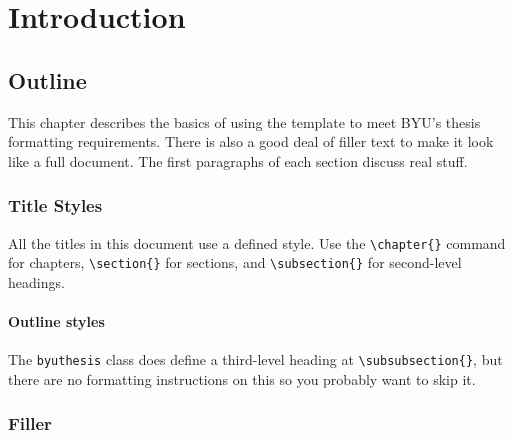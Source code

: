 \chapter{Introduction}

\section{Outline}

This chapter describes the basics of using the template to meet BYU's
thesis formatting requirements. There is also a good deal of filler text to
make it look like a full document. The first paragraphs of each section discuss
real stuff.

\subsection{Title Styles}

All the titles in this document use a defined style.  Use the \verb+\chapter{}+
command for chapters, \verb+\section{}+ for sections, and \verb+\subsection{}+
for second-level headings.

\subsubsection{Outline styles}

The \texttt{byuthesis} class does define a third-level heading
at \verb+\subsubsection{}+, but there are no formatting instructions on this so
you probably want to skip it.

\subsection{Filler}

